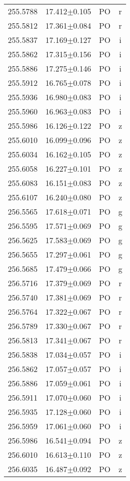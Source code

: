 \begin{table}
\begin{tabular}{cccc}
255.5788 & 17.412$\pm$0.105 & PO & r \\
255.5812 & 17.361$\pm$0.084 & PO & r \\
255.5837 & 17.169$\pm$0.127 & PO & i \\
255.5862 & 17.315$\pm$0.156 & PO & i \\
255.5886 & 17.275$\pm$0.146 & PO & i \\
255.5912 & 16.765$\pm$0.078 & PO & i \\
255.5936 & 16.980$\pm$0.083 & PO & i \\
255.5960 & 16.963$\pm$0.083 & PO & i \\
255.5986 & 16.126$\pm$0.122 & PO & z \\
255.6010 & 16.099$\pm$0.096 & PO & z \\
255.6034 & 16.162$\pm$0.105 & PO & z \\
255.6058 & 16.227$\pm$0.101 & PO & z \\
255.6083 & 16.151$\pm$0.083 & PO & z \\
255.6107 & 16.240$\pm$0.080 & PO & z \\
256.5565 & 17.618$\pm$0.071 & PO & g \\
256.5595 & 17.571$\pm$0.069 & PO & g \\
256.5625 & 17.583$\pm$0.069 & PO & g \\
256.5655 & 17.297$\pm$0.061 & PO & g \\
256.5685 & 17.479$\pm$0.066 & PO & g \\
256.5716 & 17.379$\pm$0.069 & PO & r \\
256.5740 & 17.381$\pm$0.069 & PO & r \\
256.5764 & 17.322$\pm$0.067 & PO & r \\
256.5789 & 17.330$\pm$0.067 & PO & r \\
256.5813 & 17.341$\pm$0.067 & PO & r \\
256.5838 & 17.034$\pm$0.057 & PO & i \\
256.5862 & 17.057$\pm$0.057 & PO & i \\
256.5886 & 17.059$\pm$0.061 & PO & i \\
256.5911 & 17.070$\pm$0.060 & PO & i \\
256.5935 & 17.128$\pm$0.060 & PO & i \\
256.5959 & 17.061$\pm$0.060 & PO & i \\
256.5986 & 16.541$\pm$0.094 & PO & z \\
256.6010 & 16.613$\pm$0.110 & PO & z \\
256.6035 & 16.487$\pm$0.092 & PO & z \\

\end{tabular}
\end{table}
